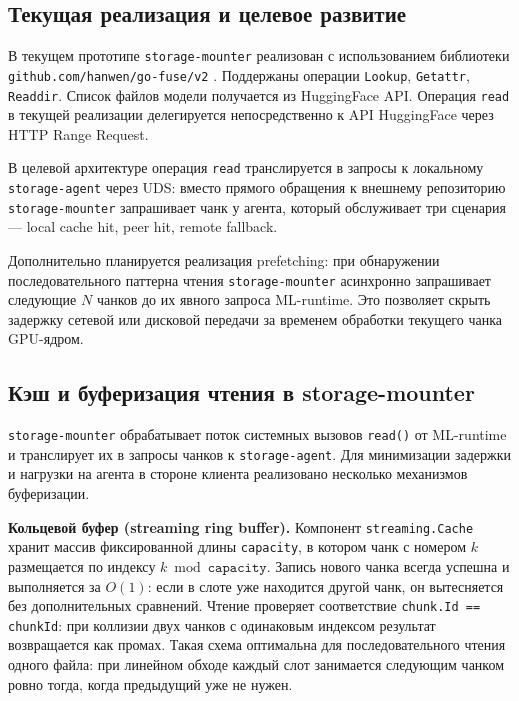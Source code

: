 \subsection*{Текущая реализация и целевое развитие}

В текущем прототипе \texttt{storage-mounter} реализован с использованием библиотеки \texttt{github.com/hanwen/go-fuse/v2} \cite{gofuse}. Поддержаны операции \texttt{Lookup}, \texttt{Getattr}, \texttt{Readdir}. Список файлов модели получается из HuggingFace API. Операция \texttt{read} в текущей реализации делегируется непосредственно к API HuggingFace через HTTP Range Request.

В целевой архитектуре операция \texttt{read} транслируется в запросы к локальному \texttt{storage-agent} через UDS: вместо прямого обращения к внешнему репозиторию \texttt{storage-mounter} запрашивает чанк у агента, который обслуживает три сценария --- local cache hit, peer hit, remote fallback.

Дополнительно планируется реализация prefetching: при обнаружении последовательного паттерна чтения \texttt{storage-mounter} асинхронно запрашивает следующие $N$ чанков до их явного запроса ML-runtime. Это позволяет скрыть задержку сетевой или дисковой передачи за временем обработки текущего чанка GPU-ядром.

\subsection*{Кэш и буферизация чтения в storage-mounter}

\texttt{storage-mounter} обрабатывает поток системных вызовов \texttt{read()} от ML-runtime и транслирует их в запросы чанков к \texttt{storage-agent}. Для минимизации задержки и нагрузки на агента в стороне клиента реализовано несколько механизмов буферизации.

\textbf{Кольцевой буфер (streaming ring buffer).} Компонент \texttt{streaming.Cache} хранит массив фиксированной длины \texttt{capacity}, в котором чанк с номером $k$ размещается по индексу $k \bmod \mathtt{capacity}$. Запись нового чанка всегда успешна и выполняется за $O(1)$: если в слоте уже находится другой чанк, он вытесняется без дополнительных сравнений. Чтение проверяет соответствие \texttt{chunk.Id == chunkId}: при коллизии двух чанков с одинаковым индексом результат возвращается как промах. Такая схема оптимальна для последовательного чтения одного файла: при линейном обходе каждый слот занимается следующим чанком ровно тогда, когда предыдущий уже не нужен.

